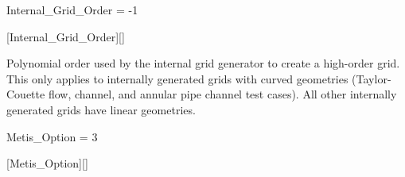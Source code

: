 
\begin{nmldescitem}
Internal_Grid_Order = -1
\end{nmldescitem}
[Internal\_Grid\_Order][]

\begin{nmldescbody}
Polynomial order used by the internal grid generator to create a
high-order grid.
%
This only applies to internally generated grids with curved geometries
(\thatis Taylor-Couette flow, channel, and annular pipe channel test cases).
%
All other internally generated grids have linear geometries.
\end{nmldescbody}


\FINALFIX{\newpage}
\begin{nmldescitem}
Metis_Option = 3
\end{nmldescitem}
[Metis\_Option][]

